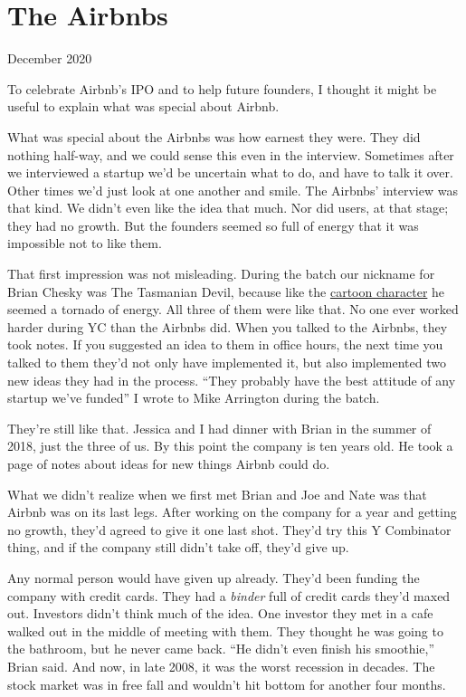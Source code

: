 \chapter{The Airbnbs}

December 2020

To celebrate Airbnb's IPO and to help future founders, I thought it
might be useful to explain what was special about Airbnb.

What was special about the Airbnbs was how earnest they were. They did
nothing half-way, and we could sense this even in the interview.
Sometimes after we interviewed a startup we'd be uncertain what to do,
and have to talk it over. Other times we'd just look at one another and
smile. The Airbnbs' interview was that kind. We didn't even like the
idea that much. Nor did users, at that stage; they had no growth. But
the founders seemed so full of energy that it was impossible not to like
them.

That first impression was not misleading. During the batch our nickname
for Brian Chesky was The Tasmanian Devil, because like the
\href{http://www.youtube.com/watch?v=StG2u5qfFRg&t=2m27s}{cartoon
character} he seemed a tornado of energy. All three of them were like
that. No one ever worked harder during YC than the Airbnbs did. When you
talked to the Airbnbs, they took notes. If you suggested an idea to them
in office hours, the next time you talked to them they'd not only have
implemented it, but also implemented two new ideas they had in the
process. ``They probably have the best attitude of any startup we've
funded'' I wrote to Mike Arrington during the batch.

They're still like that. Jessica and I had dinner with Brian in the
summer of 2018, just the three of us. By this point the company is ten
years old. He took a page of notes about ideas for new things Airbnb
could do.

What we didn't realize when we first met Brian and Joe and Nate was that
Airbnb was on its last legs. After working on the company for a year and
getting no growth, they'd agreed to give it one last shot. They'd try
this Y Combinator thing, and if the company still didn't take off,
they'd give up.

Any normal person would have given up already. They'd been funding the
company with credit cards. They had a \emph{binder} full of credit cards
they'd maxed out. Investors didn't think much of the idea. One investor
they met in a cafe walked out in the middle of meeting with them. They
thought he was going to the bathroom, but he never came back. ``He
didn't even finish his smoothie,'' Brian said. And now, in late 2008, it
was the worst recession in decades. The stock market was in free fall
and wouldn't hit bottom for another four months.

